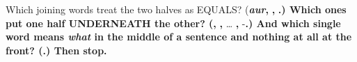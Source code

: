 \begin{tcolorbox}[breakable,colback=teal!4,colframe=teal!35!black,title={Before you move on}]
Which joining words treat the two halves as EQUALS? (\textbf{\emph{aur}, }\textbf{, }\textbf{.) Which ones put one half UNDERNEATH the other? (}\textbf{, }\textbf{, } … \textbf{, }-\textbf{.) And which single word means \emph{what} in the middle of a sentence and nothing at all at the front? (}\textbf{.) Then stop.}
\end{tcolorbox}
